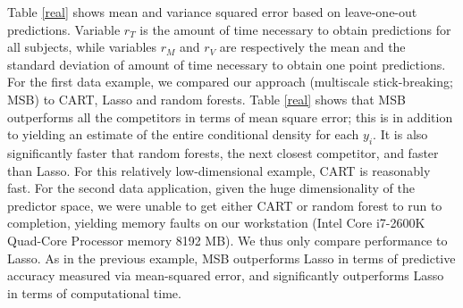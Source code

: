 Table \ref{real} shows mean and variance squared error based on leave-one-out predictions. Variable $r_{T}$ is the amount of time necessary to obtain predictions for all subjects, while variables $r_M$ and $r_V$ are respectively the mean and the standard deviation of amount of time necessary to obtain one point predictions. For the first data example, we compared our approach (multiscale stick-breaking; MSB) to CART, Lasso and random forests. 
Table \ref{real} shows that MSB outperforms all the competitors in terms of mean square error; this is in addition to yielding an estimate of the entire conditional density for each $y_i$.  It is also significantly faster that random forests, the next closest competitor, and faster than Lasso.  For this relatively low-dimensional example, CART is reasonably fast.   For the second data application, given the huge dimensionality of the predictor space, we were unable to get either CART or random forest to run to completion, yielding memory faults on our workstation (Intel Core i7-2600K Quad-Core Processor memory 8192 MB).  We thus only compare performance to Lasso.  As in the previous example, MSB outperforms Lasso in terms of predictive accuracy measured via mean-squared error, and significantly outperforms Lasso in terms of computational time.  


